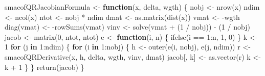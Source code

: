 \documentclass[
  12pt,
  letterpaper,
  DIV=11,
  numbers=noendperiod]{scrartcl}
\newenvironment{Shaded}{\begin{snugshade}}{\end{snugshade}}
\newcommand{\ControlFlowTok}[1]{\textcolor[rgb]{0.00,0.23,0.31}{\textbf{#1}}}
\newcommand{\DecValTok}[1]{\textcolor[rgb]{0.68,0.00,0.00}{#1}}
\newcommand{\FunctionTok}[1]{\textcolor[rgb]{0.28,0.35,0.67}{#1}}
\newcommand{\NormalTok}[1]{\textcolor[rgb]{0.00,0.23,0.31}{#1}}
\newcommand{\OtherTok}[1]{\textcolor[rgb]{0.00,0.23,0.31}{#1}}
\newcommand{\SpecialCharTok}[1]{\textcolor[rgb]{0.37,0.37,0.37}{#1}}
\begin{document}
\begin{Shaded}
\begin{Highlighting}[]
\NormalTok{smacofQRJacobianFormula }\OtherTok{\textless{}{-}} \ControlFlowTok{function}\NormalTok{(x, delta, wgth) \{}
\NormalTok{  nobj }\OtherTok{\textless{}{-}} \FunctionTok{nrow}\NormalTok{(x)}
\NormalTok{  ndim }\OtherTok{\textless{}{-}} \FunctionTok{ncol}\NormalTok{(x)}
\NormalTok{  ntot }\OtherTok{\textless{}{-}}\NormalTok{ nobj }\SpecialCharTok{*}\NormalTok{ ndim}
\NormalTok{  dmat }\OtherTok{\textless{}{-}} \FunctionTok{as.matrix}\NormalTok{(}\FunctionTok{dist}\NormalTok{(x))}
\NormalTok{  vmat }\OtherTok{\textless{}{-}} \SpecialCharTok{{-}}\NormalTok{wgth}
  \FunctionTok{diag}\NormalTok{(vmat) }\OtherTok{\textless{}{-}} \SpecialCharTok{{-}}\FunctionTok{rowSums}\NormalTok{(vmat)}
\NormalTok{  vinv }\OtherTok{\textless{}{-}} \FunctionTok{solve}\NormalTok{(vmat }\SpecialCharTok{+}\NormalTok{ (}\DecValTok{1} \SpecialCharTok{/}\NormalTok{ nobj)) }\SpecialCharTok{{-}}\NormalTok{ (}\DecValTok{1} \SpecialCharTok{/}\NormalTok{ nobj)}
\NormalTok{  jacob }\OtherTok{\textless{}{-}} \FunctionTok{matrix}\NormalTok{(}\DecValTok{0}\NormalTok{, ntot, ntot)}
\NormalTok{  e }\OtherTok{\textless{}{-}} \ControlFlowTok{function}\NormalTok{(i, n) \{}
    \FunctionTok{ifelse}\NormalTok{(i }\SpecialCharTok{==} \DecValTok{1}\SpecialCharTok{:}\NormalTok{n, }\DecValTok{1}\NormalTok{, }\DecValTok{0}\NormalTok{)}
\NormalTok{  \}}
\NormalTok{  k }\OtherTok{\textless{}{-}} \DecValTok{1}
  \ControlFlowTok{for}\NormalTok{ (j }\ControlFlowTok{in} \DecValTok{1}\SpecialCharTok{:}\NormalTok{ndim) \{}
    \ControlFlowTok{for}\NormalTok{ (i }\ControlFlowTok{in} \DecValTok{1}\SpecialCharTok{:}\NormalTok{nobj) \{}
\NormalTok{      h }\OtherTok{\textless{}{-}} \FunctionTok{outer}\NormalTok{(}\FunctionTok{e}\NormalTok{(i, nobj), }\FunctionTok{e}\NormalTok{(j, ndim))}
\NormalTok{      r }\OtherTok{\textless{}{-}} \FunctionTok{smacofQRDerivative}\NormalTok{(x, h, delta, wgth, vinv, dmat)}
\NormalTok{      jacob[, k] }\OtherTok{\textless{}{-}} \FunctionTok{as.vector}\NormalTok{(r)}
\NormalTok{      k }\OtherTok{\textless{}{-}}\NormalTok{ k }\SpecialCharTok{+} \DecValTok{1}
\NormalTok{    \}}
\NormalTok{  \}}
  \FunctionTok{return}\NormalTok{(jacob)}
\NormalTok{\}}


\end{Highlighting}
\end{Shaded}
\end{document}
